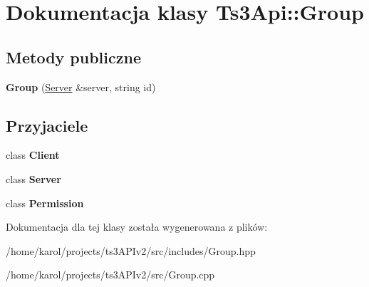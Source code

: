 \hypertarget{class_ts3_api_1_1_group}{}\section{Dokumentacja klasy Ts3\+Api\+:\+:Group}
\label{class_ts3_api_1_1_group}
\subsection*{Metody publiczne}
\begin{DoxyCompactItemize}
\item 
{\bfseries Group} (\hyperlink{class_ts3_api_1_1_server}{Server} \&server, string id)\hypertarget{class_ts3_api_1_1_group_a13b108d520b74048200fef48eecf0d72}{}\label{class_ts3_api_1_1_group_a13b108d520b74048200fef48eecf0d72}

\end{DoxyCompactItemize}
\subsection*{Przyjaciele}
\begin{DoxyCompactItemize}
\item 
class {\bfseries Client}\hypertarget{class_ts3_api_1_1_group_a5db1c99e2c94b26278f3838c85cdb618}{}\label{class_ts3_api_1_1_group_a5db1c99e2c94b26278f3838c85cdb618}

\item 
class {\bfseries Server}\hypertarget{class_ts3_api_1_1_group_ac2055578ac48afabe5af487878450f68}{}\label{class_ts3_api_1_1_group_ac2055578ac48afabe5af487878450f68}

\item 
class {\bfseries Permission}\hypertarget{class_ts3_api_1_1_group_ad3834bbd6b2c4839e7f69dc4cc1d6ae6}{}\label{class_ts3_api_1_1_group_ad3834bbd6b2c4839e7f69dc4cc1d6ae6}

\end{DoxyCompactItemize}


Dokumentacja dla tej klasy została wygenerowana z plików\+:\begin{DoxyCompactItemize}
\item 
/home/karol/projects/ts3\+A\+P\+Iv2/src/includes/Group.\+hpp\item 
/home/karol/projects/ts3\+A\+P\+Iv2/src/Group.\+cpp\end{DoxyCompactItemize}

